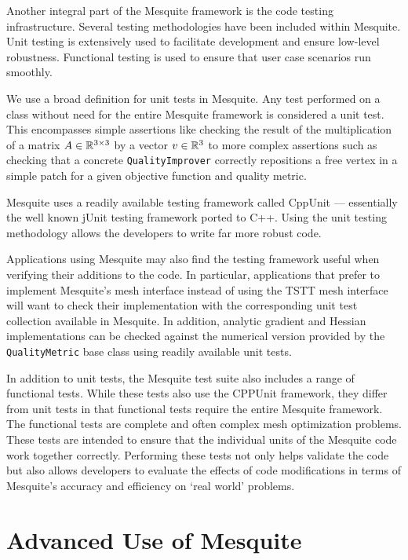 \documentclass[psfig]{article}
\begin{document}
Another integral part of the Mesquite framework is the code testing
infrastructure.  Several testing methodologies have been included
within Mesquite. Unit testing is extensively used to facilitate
development and ensure low-level robustness. Functional testing is
used to ensure that user case scenarios run smoothly.

We use a broad definition for unit tests in Mesquite. Any test
performed on a class without need for the entire Mesquite framework is
considered a unit test. This encompasses simple assertions like
checking the result of the multiplication of a matrix $A \in
\Bbb{R}^{3 \times 3}$ by a vector $v \in \Bbb{R}^{3}$ to more complex
assertions such as checking that a concrete \texttt{QualityImprover}
correctly repositions a free vertex in a simple patch for a given
objective function and quality metric.

Mesquite uses a readily available testing framework called CppUnit
\cite{cppunit} --- essentially the well known jUnit testing framework
ported to C++.  Using the unit testing methodology allows the
developers to write far more robust code.

Applications using Mesquite may also find the testing framework useful
when verifying their additions to the code. In particular,
applications that prefer to implement Mesquite's mesh interface
instead of using the TSTT mesh interface will want to
check their implementation with the corresponding unit test collection
available in Mesquite. In addition, analytic gradient and Hessian
implementations can be checked against the numerical version provided
by the {\tt QualityMetric} base class using readily available unit
tests.

In addition to unit tests, the Mesquite test suite also includes
a range of functional tests.  While these tests also use the
CPPUnit framework, they differ from unit tests in that 
functional tests require the entire Mesquite framework.
The functional tests are complete and often complex mesh
optimization problems.  These tests are intended to ensure that
the individual units of the Mesquite code work together correctly.
Performing these tests not only helps
validate the code but also allows developers to evaluate the
effects of code modifications in terms of Mesquite's accuracy
and efficiency on `real world' problems.

\section{Advanced Use of Mesquite}
\end{document}
